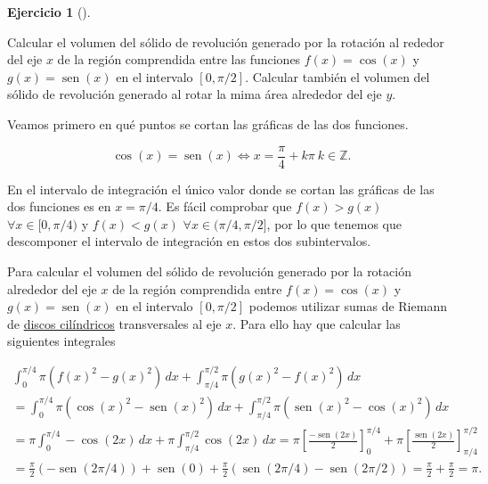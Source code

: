 \documentclass[
  spanish,
  a4paper,
]{scrreport}
\theoremstyle{definition}
\newtheorem{exercise}{Ejercicio}[chapter]
\theoremstyle{remark}
\begin{document}
\begin{exercise}[]\protect\hypertarget{exr-volumen-revolucion-3}{}\label{exr-volumen-revolucion-3}

Calcular el volumen del sólido de revolución generado por la rotación al
rededor del eje \(x\) de la región comprendida entre las funciones
\(f(x)=\cos(x)\) y \(g(x)=\operatorname{sen}(x)\) en el intervalo
\([0,\pi/2]\). Calcular también el volumen del sólido de revolución
generado al rotar la mima área alrededor del eje \(y\).

\end{exercise}

\begin{tcolorbox}[enhanced jigsaw, arc=.35mm, bottomrule=.15mm, bottomtitle=1mm, breakable, colback=white, colbacktitle=quarto-callout-tip-color!10!white, colframe=quarto-callout-tip-color-frame, coltitle=black, left=2mm, leftrule=.75mm, opacityback=0, opacitybacktitle=0.6, rightrule=.15mm, title=\textcolor{quarto-callout-tip-color}{\faLightbulb}\hspace{0.5em}{Solución}, titlerule=0mm, toprule=.15mm, toptitle=1mm]

Veamos primero en qué puntos se cortan las gráficas de las dos
funciones.

\[
\cos(x)=\operatorname{sen}(x) \Leftrightarrow x = \frac{\pi}{4}+k\pi\ k\in\mathbb{Z}.
\]

En el intervalo de integración el único valor donde se cortan las
gráficas de las dos funciones es en \(x=\pi/4\). Es fácil comprobar que
\(f(x)>g(x)\) \(\forall x\in [0,\pi/4)\) y \(f(x)<g(x)\)
\(\forall x\in (\pi/4,\pi/2]\), por lo que tenemos que descomponer el
intervalo de integración en estos dos subintervalos.

Para calcular el volumen del sólido de revolución generado por la
rotación alrededor del eje \(x\) de la región comprendida entre
\(f(x)=\cos(x)\) y \(g(x)=\operatorname{sen}(x)\) en el intervalo
\([0,\pi/2]\) podemos utilizar sumas de Riemann de
\href{https://aprendeconalf.es/analisis-manual/08-integrales.html\#c\%C3\%A1lculo-de-vol\%C3\%BAmenes-de-s\%C3\%B3lidos-de-revoluci\%C3\%B3n}{discos
cilíndricos} transversales al eje \(x\). Para ello hay que calcular las
siguientes integrales

\[
\begin{gathered}
\int_0^{\pi/4} \pi (f(x)^2-g(x)^2)\,dx + \int_{\pi/4}^{\pi/2} \pi (g(x)^2 - f(x)^2)\,dx \\
= \int_0^{\pi/4} \pi (\cos(x)^2-\operatorname{sen}(x)^2)\,dx + \int_{\pi/4}^{\pi/2} \pi (\operatorname{sen}(x)^2 - \cos(x)^2)\,dx \\
= \pi  \int_0^{\pi/4} -\cos(2x)\,dx + \pi \int_{\pi/4}^{\pi/2} \cos(2x)\,dx
= \pi \left[\frac{-\operatorname{sen}(2x)}{2}\right]_0^{\pi/4} + \pi \left[\frac{\operatorname{sen}(2x)}{2}\right]_{\pi/4}^{\pi/2} \\
=  \frac{\pi}{2} (-\operatorname{sen}(2\pi/4)) +\operatorname{sen}(0) + \frac{\pi}{2} (\operatorname{sen}(2\pi/4)-\operatorname{sen}(2\pi/2)) 
= \frac{\pi}{2}+\frac{\pi}{2}
= \pi.
\end{gathered}
\]


\end{tcolorbox}
\end{document}
